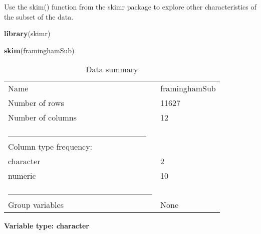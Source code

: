 \documentclass[
]{article}
\newenvironment{Shaded}{\begin{snugshade}}{\end{snugshade}}
\newcommand{\FunctionTok}[1]{\textcolor[rgb]{0.13,0.29,0.53}{\textbf{#1}}}
\newcommand{\NormalTok}[1]{#1}
\begin{document}
Use the skim() function from the skimr package to explore other
characteristics of the subset of the data.

\begin{Shaded}
\begin{Highlighting}[]
\FunctionTok{library}\NormalTok{(skimr)}

\FunctionTok{skim}\NormalTok{(framinghamSub)}
\end{Highlighting}
\end{Shaded}

\begin{longtable}[]{@{}ll@{}}
\caption{Data summary}\tabularnewline
\toprule\noalign{}
\endfirsthead
\endhead
\bottomrule\noalign{}
\endlastfoot
Name & framinghamSub \\
Number of rows & 11627 \\
Number of columns & 12 \\
\_\_\_\_\_\_\_\_\_\_\_\_\_\_\_\_\_\_\_\_\_\_\_ & \\
Column type frequency: & \\
character & 2 \\
numeric & 10 \\
\_\_\_\_\_\_\_\_\_\_\_\_\_\_\_\_\_\_\_\_\_\_\_\_ & \\
Group variables & None \\
\end{longtable}

\textbf{Variable type: character}
\end{document}
